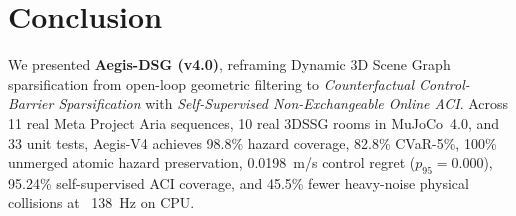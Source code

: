 \documentclass[journal]{IEEEtran}
\begin{document}
\section{Conclusion}
We presented \textbf{Aegis-DSG (v4.0)}, reframing Dynamic 3D Scene Graph sparsification from open-loop geometric filtering to \emph{Counterfactual Control-Barrier Sparsification} with \emph{Self-Supervised Non-Exchangeable Online ACI}. Across 11 real Meta Project Aria sequences, 10 real 3DSSG rooms in MuJoCo~4.0, and 33 unit tests, Aegis-V4 achieves 98.8\% hazard coverage, 82.8\% CVaR-5\%, 100\% unmerged atomic hazard preservation, 0.0198~m/s control regret ($p_{95} = 0.000$), 95.24\% self-supervised ACI coverage, and 45.5\% fewer heavy-noise physical collisions at ~138~Hz on CPU.



\end{document}
